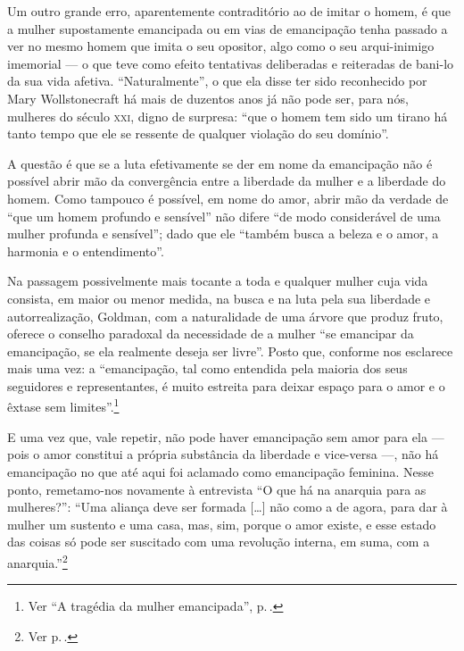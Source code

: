 Um outro grande erro, aparentemente contraditório ao de imitar o homem,
é que a mulher supostamente emancipada ou em vias de
emancipação tenha passado a ver no mesmo homem que imita o seu opositor,
algo como o seu arqui-inimigo imemorial --- o que teve como efeito
tentativas deliberadas e reiteradas de bani-lo da sua vida afetiva.
``Naturalmente'', o que ela disse ter sido reconhecido por Mary
Wollstonecraft há mais de duzentos anos já não pode ser, para nós, mulheres
do século \textsc{xxi}, digno de surpresa: ``que o homem tem sido um tirano há
tanto tempo que ele se ressente de qualquer violação do seu domínio''.

A
questão é que se a luta efetivamente se der em nome da
emancipação não é possível abrir mão da convergência entre a
liberdade da mulher e a liberdade do homem. Como tampouco é possível, em
nome do amor, abrir mão da verdade de ``que um homem profundo e
sensível'' não difere ``de modo considerável de uma mulher profunda e
sensível''; dado que ele ``também busca a beleza e o amor, a harmonia e
o entendimento''.

Na passagem possivelmente mais tocante a toda e
qualquer mulher cuja vida consista, em maior ou menor medida, na busca e
na luta pela sua liberdade e autorrealização, Goldman, com a
naturalidade de uma árvore que produz fruto, oferece o conselho
paradoxal da necessidade de a mulher ``se emancipar da emancipação, se
ela realmente deseja ser livre''. Posto que, conforme nos esclarece mais
uma vez: a ``emancipação, tal como entendida pela maioria dos seus
seguidores e representantes, é muito estreita para deixar espaço para o
amor e o êxtase sem limites''.\footnote{Ver ``A tragédia da mulher emancipada'', p.\,\pageref{extase}.}

E uma vez que, vale repetir, não pode haver emancipação sem amor para ela
--- pois o amor constitui a própria substância da liberdade e
vice-versa ---, não há emancipação no que até aqui foi aclamado como
emancipação feminina. Nesse ponto, remetamo-nos novamente à entrevista
``O que há na anarquia para as mulheres?'': ``Uma aliança
deve ser formada {[}\ldots{]} não como a de agora, para dar à mulher um
sustento e uma casa, mas, sim, porque o amor existe, e esse estado das
coisas só pode ser suscitado com uma revolução interna, em suma, com a
anarquia.''\footnote{Ver p.\,\pageref{alianca}.}

